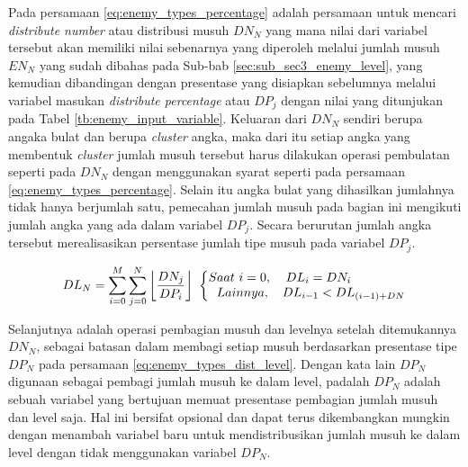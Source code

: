 Pada persamaan \ref{eq:enemy_types_percentage} adalah persamaan untuk mencari \textit{distribute number} atau distribusi musuh $DN_{N}$ yang mana nilai dari variabel tersebut akan memiliki nilai sebenarnya yang diperoleh melalui jumlah musuh $EN_{N}$ yang sudah dibahas pada Sub-bab \ref{sec:sub_sec3_enemy_level}, yang kemudian dibandingan dengan presentase yang disiapkan sebelumnya melalui variabel masukan \textit{distribute percentage} atau $DP_{j}$ dengan nilai yang ditunjukan pada Tabel \ref{tb:enemy_input_variable}. Keluaran dari $DN_{N}$ sendiri berupa angaka bulat dan berupa \textit{cluster} angka, maka dari itu setiap angka yang membentuk \textit{cluster} jumlah musuh tersebut harus dilakukan operasi pembulatan seperti pada $DN_{N}$ dengan menggunakan syarat seperti pada persamaan \ref{eq:enemy_types_percentage}. Selain itu angka bulat yang dihasilkan jumlahnya tidak hanya berjumlah satu, pemecahan jumlah musuh pada bagian ini mengikuti jumlah angka yang ada dalam variabel $DP_{j}$. Secara berurutan jumlah angka tersebut merealisasikan persentase jumlah tipe musuh pada variabel $DP_{j}$.
\vspace{1ex}

\begin{equation}\label{eq:enemy_types_dist_level}
\begin{split}
	DL_{N} = \sum_{i = 0}^{M} \sum_{j = 0}^{N} \left \lfloor \frac{DN_{j}}{DP_{i}} \right \rfloor\
	\left\{\begin{matrix} 
	Saat\ i = 0, & \hspace{-4.0em}DL_{i} = DN_{i} \\ 
	\hspace{0.5em} Lainnya, & DL_{i - 1} < DL_{(i - 1) + DN}
	\end{matrix}\right.
\end{split}
\end{equation}

Selanjutnya adalah operasi pembagian musuh dan levelnya setelah ditemukannya $DN_{N}$, sebagai batasan dalam membagi setiap musuh berdasarkan presentase tipe $DP_{N}$ pada persamaan \ref{eq:enemy_types_dist_level}. Dengan kata lain $DP_{N}$ digunaan sebagai pembagi jumlah musuh ke dalam level, padalah $DP_{N}$ adalah sebuah variabel yang bertujuan memuat presentase pembagian jumlah musuh dan level saja. Hal ini bersifat opsional dan dapat terus dikembangkan mungkin dengan menambah variabel baru untuk mendistribusikan jumlah musuh ke dalam level dengan tidak menggunakan variabel $DP_{N}$.
\vspace{1ex}


